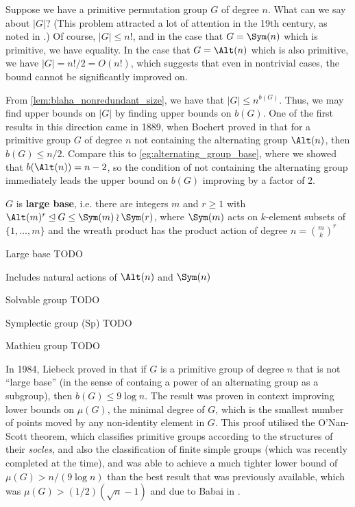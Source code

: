 Suppose we have a primitive permutation group $G$ of degree $n$. What can we say about $|G|$? (This problem attracted a lot of attention in the 19th century, as noted in \cite{moscatiello_roney-dougal2021}.) Of course, $|G| \leq n!$, and in the case that $G = \Sym(n)$ which is primitive, we have equality. In the case that $G = \Alt(n)$ which is also primitive, we have $|G| = n!/2 = O(n!)$, which suggests that even in nontrivial cases, the bound cannot be significantly improved on.

From \autoref{lem:blaha_nonredundant_size}, we have that $|G| \leq n^{b(G)}$. Thus, we may find upper bounds on $|G|$ by finding upper bounds on $b(G)$. One of the first results in this direction came in 1889, when Bochert proved in \cite{bochert1889} that for a primitive group $G$ of degree $n$ not containing the alternating group $\Alt(n)$, then $b(G) \leq n/2$. Compare this to \autoref{eg:alternating_group_base}, where we showed that $b(\Alt(n)) = n-2$, so the condition of not containing the alternating group immediately leads the upper bound on $b(G)$ improving by a factor of 2.

\begin{definition}\label{def:large_base}
    $G$ is \textbf{large base}, i.e. there are integers $m$ and $r \geq 1$ with $\Alt(m)^r \unlhd G \leq \Sym(m) \wr \Sym(r)$, where $\Sym(m)$ acts on $k$-element subsets of $\{1,\dotsc,m\}$ and the wreath product has the product action of degree $n = \binom{m}{k}^r$

    Large base TODO

    Includes natural actions of $\Alt(n)$ and $\Sym(n)$
\end{definition}

\begin{definition}\label{def:solvable_group}
    Solvable group TODO
\end{definition}

\begin{definition}\label{def:symplectic_group}
    Symplectic group (Sp) TODO
\end{definition}

\begin{definition}\label{def:mathieu_group}
    Mathieu group TODO
\end{definition}

In 1984, Liebeck proved in \cite{liebeck1984} that if $G$ is a primitive group of degree $n$ that is not ``large base'' (in the sense of containg a power of an alternating group as a subgroup), then $b(G) \leq 9\log n$. The result was proven in context improving lower bounds on $\mu(G)$, the minimal degree of $G$, which is the smallest number of points moved by any non-identity element in $G$. This proof utilised the O'Nan-Scott theorem, which classifies primitive groups according to the structures of their \textit{socles}, and also the classification of finite simple groups (which was recently completed at the time), and was able to achieve a much tighter lower bound of $\mu(G) > n/(9 \log n)$ than the best result that was previously available, which was $\mu(G) > (1/2)(\sqrt{n} - 1)$ and due to Babai in \cite{babai1981}.

